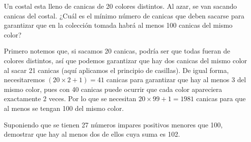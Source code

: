 \documentclass[12pt]{article}
\begin{document}
\begin{ejemplo}
    Un costal esta lleno de canicas de 20 colores distintos. Al azar, se van sacando canicas del costal. ¿Cuál es el mínimo número de canicas que deben sacarse para garantizar que en la colección tomada habrá al menos 100 canicas del mismo color?
\end{ejemplo}

\begin{solucion}
    Primero notemos que, si sacamos 20 canicas, podría ser que todas fueran de colores distintos, así que podemos garantizar que hay dos canicas del mismo color al sacar 21 canicas (aquí aplicamos el principio de casillas). De igual forma, necesitaremos $(20 \times 2 + 1) = 41$ canicas para garantizar que hay al menos 3 del mismo color, pues con 40 canicas puede ocurrir que cada color apareciera exactamente 2 veces. Por lo que se necesitan $20 \times 99 + 1 = 1981$ canicas para que al menos se tengan 100 del mismo color.
\end{solucion}

\begin{ejemplo}
    Suponiendo que se tienen 27 números impares positivos menores que 100, demostrar que hay al menos dos de ellos cuya suma es 102.
\end{ejemplo}
\end{document}
